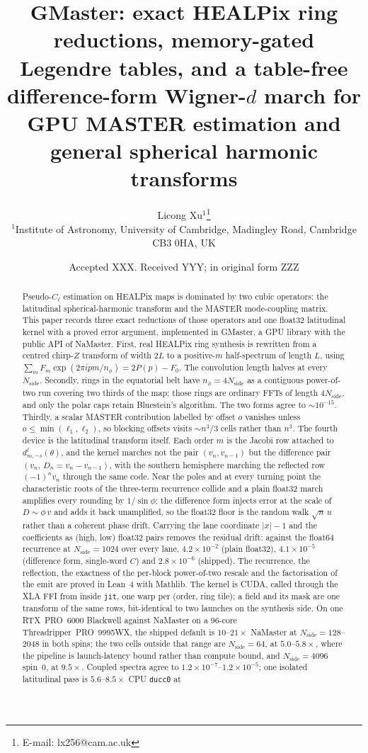 \documentclass[usenatbib,useAMS]{mnras}
\title[GMaster: GPU MASTER and general SHT]{GMaster: exact HEALPix ring reductions, memory-gated Legendre tables, and a table-free difference-form Wigner-$d$ march for GPU MASTER estimation and general spherical harmonic transforms}
\author[Xu]{
Licong Xu$^{1}$\thanks{E-mail: lx256@cam.ac.uk}\\
$^{1}$Institute of Astronomy, University of Cambridge, Madingley Road, Cambridge CB3 0HA, UK
}
\date{Accepted XXX. Received YYY; in original form ZZZ}
\begin{document}
\label{firstpage}
\pagerange{\pageref{firstpage}--\pageref{lastpage}}
\maketitle

\begin{abstract}
Pseudo-$C_\ell$ estimation on HEALPix maps is dominated by two cubic operators: the latitudinal spherical-harmonic transform and the MASTER mode-coupling matrix. This paper records three exact reductions of those operators and one float32 latitudinal kernel with a proved error argument, implemented in GMaster, a GPU library with the public API of NaMaster. First, real HEALPix ring synthesis is rewritten from a centred chirp-$Z$ transform of width $2L$ to a positive-$m$ half-spectrum of length $L$, using $\sum_m F_m\exp(2\pi i p m/n_\phi)=2P(p)-F_0$. The convolution length halves at every $N_{\mathrm{side}}$. Secondly, rings in the equatorial belt have $n_\phi=4N_{\mathrm{side}}$ as a contiguous power-of-two run covering two thirds of the map; those rings are ordinary FFTs of length $4N_{\mathrm{side}}$, and only the polar caps retain Bluestein's algorithm. The two forms agree to $\sim10^{-15}$. Thirdly, a scalar MASTER contribution labelled by offset $o$ vanishes unless $o\le\min(\ell_1,\ell_2)$, so blocking offsets visits $\sim n^3/3$ cells rather than $n^3$. The fourth device is the latitudinal transform itself. Each order $m$ is the Jacobi row attached to $d^\ell_{m,-s}(\theta)$, and the kernel marches not the pair $(v_n,v_{n-1})$ but the difference pair $(v_n,\,D_n=v_n-v_{n-1})$, with the southern hemisphere marching the reflected row $(-1)^n v_n$ through the same code. Near the poles and at every turning point the characteristic roots of the three-term recurrence collide and a plain float32 march amplifies every rounding by $1/\sin\phi$; the difference form injects error at the scale of $D\sim\phi\,v$ and adds it back unamplified, so the float32 floor is the random walk $\sqrt{n}\,u$ rather than a coherent phase drift. Carrying the lane coordinate $\lvert x\rvert-1$ and the coefficients as (high, low) float32 pairs removes the residual drift: against the float64 recurrence at $N_{\mathrm{side}}=1024$ over every lane, $4.2\times10^{-2}$ (plain float32), $4.1\times10^{-5}$ (difference form, single-word $C$) and $2.8\times10^{-6}$ (shipped). The recurrence, the reflection, the exactness of the per-block power-of-two rescale and the factorisation of the emit are proved in Lean~4 with Mathlib. The kernel is CUDA, called through the XLA FFI from inside \texttt{jit}, one warp per (order, ring tile); a field and its mask are one transform of the same rows, bit-identical to two launches on the synthesis side. On one RTX~PRO~6000 Blackwell against NaMaster on a 96-core Threadripper~PRO~9995WX, the shipped default is $10$--$21\times$ NaMaster at $N_{\mathrm{side}}=128$--$2048$ in both spins; the two cells outside that range are $N_{\mathrm{side}}=64$, at $5.0$--$5.8\times$, where the pipeline is launch-latency bound rather than compute bound, and $N_{\mathrm{side}}=4096$ spin~$0$, at $9.5\times$. Coupled spectra agree to $1.2\times10^{-7}$--$1.2\times10^{-5}$; one isolated latitudinal pass is $5.6$--$8.5\times$ CPU \texttt{ducc0} at 
\end{abstract}
\end{document}
